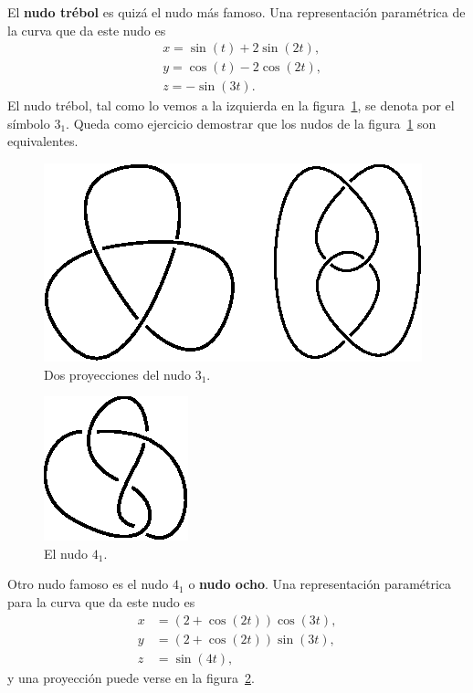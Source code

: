 \documentclass[graybox]{svmult}
\begin{document}
\begin{example}
    El \textbf{nudo trébol} es quizá el nudo más famoso. Una representación
    paramétrica de la curva que da este nudo es 
    \begin{align*}
        &x=\sin(t)+2\sin(2t),\\
        &y=\cos(t)-2\cos(2t),\\
        &z=-\sin(3t).
    \end{align*}
	El nudo trébol, tal como lo vemos a la izquierda en la
	figura~\ref{fig:trefoil}, se denota por el símbolo $3_1$.  Queda como
	ejercicio demostrar que los nudos de la figura~\ref{fig:trefoil} son
	equivalentes.
\end{example}

\begin{example}
	\begin{figure}[ht]
		\centering
		\includegraphics[scale=0.6]{images/trefoils}
		\caption{Dos proyecciones del nudo $3_1$.}
		\label{fig:trefoil}
	\end{figure}
	\begin{figure}[ht]
		\centering
		\includegraphics[scale=0.6]{images/4_1unoriented}
		\caption{El nudo $4_1$.}
		\label{fig:4_1:unoriented}
	\end{figure}

    Otro nudo famoso es el nudo $4_1$ o \textbf{nudo ocho}. Una
    representación paramétrica para la curva que da este nudo es
	\begin{align*}
		x&=(2+\cos(2t))\cos(3t),\\
		y&=(2+\cos(2t))\sin(3t),\\
		z&=\sin(4t),
	\end{align*}
	y una proyección puede verse en la figura~\ref{fig:4_1:unoriented}.
\end{example}
\end{document}
